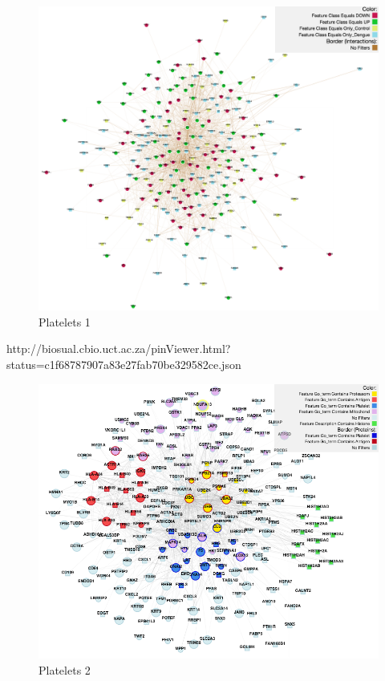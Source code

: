\begin{figure}
\centering
\includegraphics[width=5in]{figures/pinv_platelets_1.png}
\caption[Platelets1 ]{Platelets 1
\label{fig:pinv_platelets_1}}
\end{figure}

http://biosual.cbio.uct.ac.za/pinViewer.html?status=c1f68787907a83e27fab70be329582ce.json

\begin{figure}
\centering
\includegraphics[width=\textwidth]{figures/pinv_platelets_2.png}
\caption[Platelets 2]{Platelets 2
\label{fig:pinv_platelets_2}}
\end{figure}

